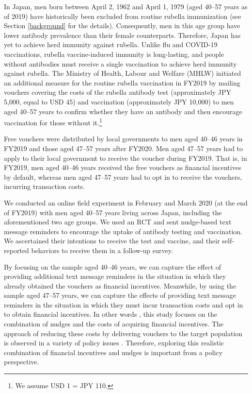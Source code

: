 \documentclass[
]{article}
\begin{document}
In Japan, men born between April 2, 1962 and April 1, 1979 (aged 40--57 years as of 2019) have historically been excluded from routine rubella immunization (see Section \ref{background} for the details). Consequently, men in this age group have lower antibody prevalence than their female counterparts. Therefore, Japan has yet to achieve herd immunity against rubella. Unlike flu and COVID-19 vaccinations, rubella vaccine-induced immunity is long-lasting, and people without antibodies must receive a single vaccination to achieve herd immunity against rubella. The Ministry of Health, Labour and Welfare (MHLW) initiated an additional measure for the routine rubella vaccination in FY2019 by mailing vouchers covering the costs of the rubella antibody test (approximately JPY 5,000, equal to USD 45) and vaccination (approximately JPY 10,000) to men aged 40--57 years to confirm whether they have an antibody and then encourage vaccination for those without it.\footnote{We assume USD 1 = JPY 110.}

Free vouchers were distributed by local governments to men aged 40--46 years in FY2019 and those aged 47--57 years after FY2020. Men aged 47--57 years had to apply to their local government to receive the voucher during FY2019. That is, in FY2019, men aged 40--46 years received the free vouchers as financial incentives by default, whereas men aged 47--57 years had to opt in to receive the vouchers, incurring transaction costs.

We conducted an online field experiment in February and March 2020 (at the end of FY2019) with men aged 40--57 years living across Japan, including the aforementioned two age groups. We used an RCT and sent nudge-based text message reminders to encourage the uptake of antibody testing and vaccination. We ascertained their intentions to receive the test and vaccine, and their self-reported behaviors to receive them in a follow-up survey.

By focusing on the sample aged 40--46 years, we can capture the effect of providing additional text message reminders in the situation in which they already obtained the vouchers as financial incentives. Meanwhile, by using the sample aged 47--57 years, we can capture the effects of providing text message reminders in the situation in which they must incur transaction costs and opt in to obtain financial incentives. In other words , this study focuses on the combination of nudges and the costs of acquiring financial incentives. The approach of reducing these costs by delivering vouchers to the target population is observed in a variety of policy issues \citep[e.g.,][]{Ahmed2011, Kacker2022}. Therefore, exploring this realistic combination of financial incentives and nudges is important from a policy perspective.
\end{document}
